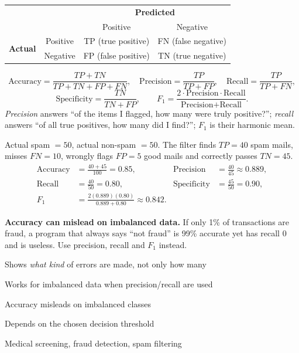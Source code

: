 \begin{center}
\begin{tabular}{@{}cc|cc@{}}
\toprule
 & & \multicolumn{2}{c}{\textbf{Predicted}}\\
 & & Positive & Negative\\
\midrule
\multirow{2}{*}{\textbf{Actual}} & Positive & TP (true positive) & FN (false negative)\\
 & Negative & FP (false positive) & TN (true negative)\\
\bottomrule
\end{tabular}
\end{center}

\[
\text{Accuracy}=\frac{TP+TN}{TP+TN+FP+FN},\quad
\text{Precision}=\frac{TP}{TP+FP},\quad
\text{Recall}=\frac{TP}{TP+FN},
\]
\[
\text{Specificity}=\frac{TN}{TN+FP},\qquad
F_1=\frac{2\cdot\text{Precision}\cdot\text{Recall}}{\text{Precision}+\text{Recall}} .
\]
\emph{Precision} answers ``of the items I flagged, how many were truly positive?''; \emph{recall} answers ``of all true positives, how many did I find?''; $F_1$ is their harmonic mean.


\begin{example}
Actual spam $=50$, actual non-spam $=50$. The filter finds $TP=40$ spam mails, misses $FN=10$, wrongly flags $FP=5$ good mails and correctly passes $TN=45$.
\begin{align*}
\text{Accuracy}&=\tfrac{40+45}{100}=0.85, & \text{Precision}&=\tfrac{40}{45}\approx0.889,\\
\text{Recall}&=\tfrac{40}{50}=0.80, & \text{Specificity}&=\tfrac{45}{50}=0.90,\\
F_1&=\tfrac{2(0.889)(0.80)}{0.889+0.80}\approx 0.842 . & &
\end{align*}
\end{example}

\begin{warning}
\textbf{Accuracy can mislead on imbalanced data.} If only 1\% of transactions are fraud, a program that always says ``not fraud'' is 99\% accurate yet has recall $0$ and is useless. Use precision, recall and $F_1$ instead.
\end{warning}

{\item Shows \emph{what kind} of errors are made, not only how many
 \item Works for imbalanced data when precision/recall are used}
{\item Accuracy misleads on imbalanced classes
 \item Depends on the chosen decision threshold}
{\item Medical screening, fraud detection, spam filtering}

